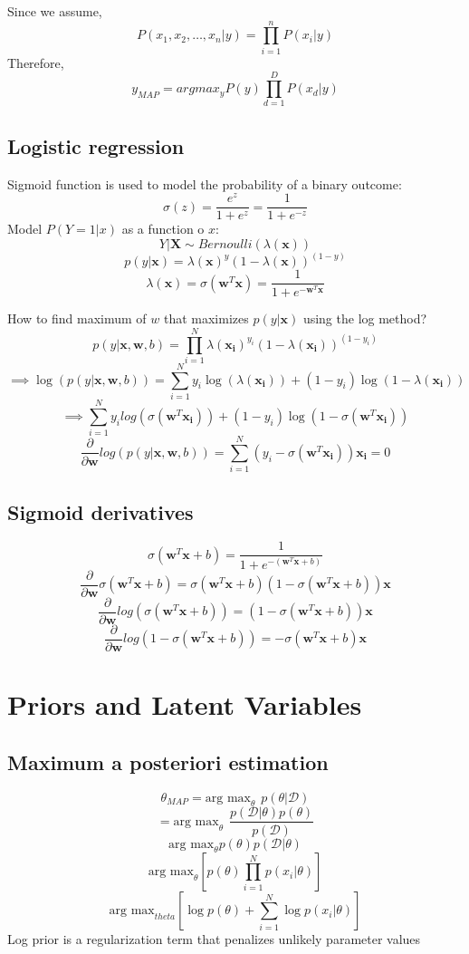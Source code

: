 \documentclass[12pt,a4paper]{article}
\begin{document}
Since we assume,
\[
P(x_1, x_2, \ldots, x_n | y) = \prod_{i=1}^n P(x_i | y)
\]
Therefore,
\[
y_{MAP} = arg max_y P(y) \prod_{d=1}^{D} P(x_d | y)
\]

\subsection{Logistic regression}
Sigmoid function is used to model the probability of a binary outcome:
\[
\sigma(z) = \frac{e^{z}}{1 + e^{z}} = \frac{1}{1 + e^{-z}}
\]
Model $P(Y = 1 | x)$ as a function o $x$:
\[
Y | \mathbf{X} \sim Bernoulli(\lambda(\mathbf{x}))
\]
\[
p(y|\mathbf{x}) = \lambda(\mathbf{x})^{y}(1 - \lambda(\mathbf{x}))^{(1 - y)}
\]
\[
\lambda(\mathbf{x}) = \sigma(\mathbf{w}^T \mathbf{x}) = \frac{1}{1 + e^{-\mathbf{w}^T \mathbf{x}}}
\]

How to find maximum of $w$ that maximizes $p(y|\mathbf{x})$ using the log method?
\[
p(y | \mathbf{x}, \mathbf{w}, b) = \prod_{i=1}^{N} \lambda(\mathbf{x_i})^{y_i}(1 - \lambda(\mathbf{x_i}))^{(1 - y_i)}
\]
\[
\implies \log(p(y | \mathbf{x}, \mathbf{w}, b)) = \sum_{i=1}^{N} y_i \log(\lambda(\mathbf{x_i})) + (1 - y_i) \log(1 - \lambda(\mathbf{x_i}))
\]
\[
\implies \sum_{i=1}^{N} y_i log(\sigma(\mathbf{w}^T \mathbf{x_i})) + (1 - y_i) \log(1 - \sigma(\mathbf{w}^T \mathbf{x_i}))
\]
\[
\frac{\partial}{\partial \mathbf{w}}log(p(y | \mathbf{x}, \mathbf{w}, b)) = \sum_{i=1}^{N} (y_i - \sigma(\mathbf{w}^T \mathbf{x_i}))\mathbf{x_i} = 0
\]

\subsection{Sigmoid derivatives}
\[
\sigma(\mathbf{w}^T\mathbf{x} + b) = \frac{1}{1 + e^{-(\mathbf{w}^T\mathbf{x} + b)}}
\]
\[
\frac{\partial}{\partial \mathbf{w}} \sigma(\mathbf{w}^T\mathbf{x} + b) = \sigma(\mathbf{w}^T\mathbf{x} + b)(1 - \sigma(\mathbf{w}^T\mathbf{x} + b))\mathbf{x}
\]
\[
\frac{\partial}{\partial \mathbf{w}} log(\sigma(\mathbf{w}^T\mathbf{x} + b)) = (1 - \sigma(\mathbf{w}^T\mathbf{x} + b))\mathbf{x}
\]
\[
\frac{\partial}{\partial \mathbf{w}} log(1 - \sigma(\mathbf{w}^T\mathbf{x} + b)) = -\sigma(\mathbf{w}^T\mathbf{x} + b)\mathbf{x}
\]

\section{Priors and Latent Variables}
\subsection{Maximum a posteriori estimation}
\[
\theta_{MAP} = \text{arg max}_{\theta} \hspace{5pt} p(\theta | \mathcal{D})
\]
\[
= \text{arg max}_{\theta} \hspace{5pt} \frac{p(\mathcal{D} | \theta)p(\theta)}{p(\mathcal{D})}
\]
\[
\text{arg max}_{\theta} p(\theta) p(\mathcal{D} | \theta)
\]
\[
\text{arg max}_{\theta} \left[ p(\theta) \prod_{i=1}^{N} p(x_i | \theta)\right]
\]
\[
\text{arg max}_{theta} \left[ \log p(\theta) + \sum_{i=1}^{N} \log p(x_i | \theta)\right]
\]
Log prior is a regularization term that penalizes unlikely parameter values
\end{document}
